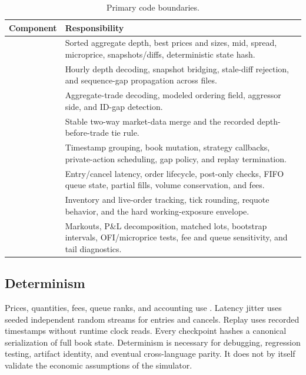 \begin{table}[H]
\centering
\caption{Primary code boundaries.}
\begin{tabularx}{\textwidth}{@{}L{0.29\textwidth}Y@{}}
\toprule
Component & Responsibility \\
\midrule
{} & Sorted aggregate depth, best prices and sizes, mid, spread, microprice, snapshots/diffs, deterministic state hash. \\
 & Hourly depth decoding, snapshot bridging, stale-diff rejection, and sequence-gap propagation across files. \\
 & Aggregate-trade decoding, modeled ordering field, aggressor side, and ID-gap detection. \\
 & Stable two-way market-data merge and the recorded depth-before-trade tie rule. \\
 & Timestamp grouping, book mutation, strategy callbacks, private-action scheduling, gap policy, and replay termination. \\
 & Entry/cancel latency, order lifecycle, post-only checks, FIFO queue state, partial fills, volume conservation, and fees. \\
 & Inventory and live-order tracking, tick rounding, requote behavior, and the hard working-exposure envelope. \\
 & Markouts, P\&L decomposition, matched lots, bootstrap intervals, OFI/microprice tests, fee and queue sensitivity, and tail diagnostics. \\
\bottomrule
\end{tabularx}
\end{table}

\subsection{Determinism}

Prices, quantities, fees, queue ranks, and accounting use
. Latency jitter uses seeded independent random streams
for entries and cancels. Replay uses recorded timestamps without runtime clock
reads. Every
checkpoint hashes a canonical serialization of full book state. Determinism is
necessary for debugging, regression testing, artifact identity, and eventual
cross-language parity. It does not by itself validate the economic assumptions
of the simulator.
